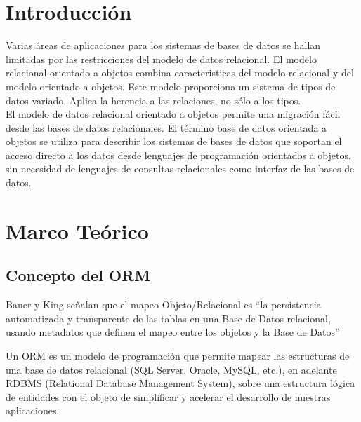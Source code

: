 \documentclass[preprint,12pt]{elsarticle}
\begin{document}

\section{Introducción} 
Varias áreas de aplicaciones para los sistemas de bases de datos se hallan limitadas por las restricciones del modelo de datos relacional. El modelo relacional orientado a objetos combina caracteristicas del modelo relacional y del modelo orientado a objetos. Este modelo proporciona un sistema de tipos de datos variado. Aplica la herencia a las relaciones, no sólo a los tipos.\\El modelo de datos relacional orientado a objetos permite una migración fácil desde las bases de datos relacionales.
El término base de datos orientada a objetos se utiliza para describir los sistemas de bases de datos que soportan el acceso directo a los datos desde lenguajes de programación orientados a objetos, sin necesidad de lenguajes de consultas relacionales como interfaz de las bases de datos.




\section{Marco Teórico}


\subsection {\textbf{Concepto del ORM}}

Bauer y King señalan que el mapeo Objeto/Relacional es “la persistencia automatizada y transparente de las tablas en una Base de Datos relacional, usando metadatos que definen el mapeo entre los objetos y la Base de Datos” \cite{BauerKing2005} 

Un ORM es un modelo de programación que permite mapear las estructuras de una base de datos relacional (SQL Server, Oracle, MySQL, etc.), en adelante RDBMS (Relational Database Management System), sobre una estructura lógica de entidades con el objeto de simplificar y acelerar el desarrollo de nuestras aplicaciones.\cite{Deloitte1} 
\end{document}
